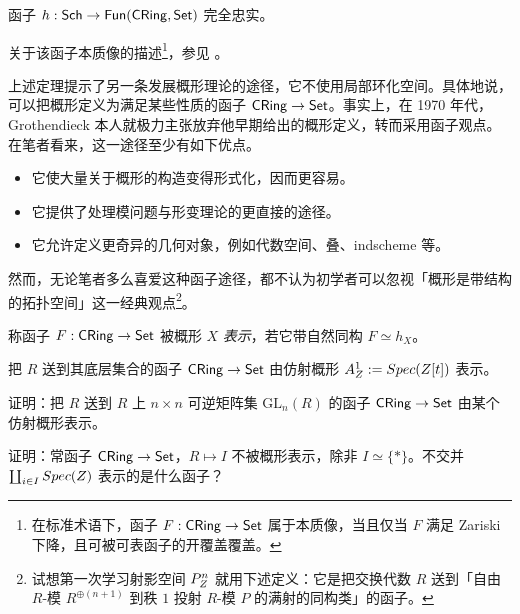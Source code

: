 \begin{theorem}\label{thm:8.2.3}
函子 $h:\mathsf{Sch}\to\mathsf{Fun}(\mathsf{CRing},\mathsf{Set})$ 完全忠实。
\end{theorem}

\begin{remark}\label{rem:8.2.4}
关于该函子本质像的描述\footnote{在标准术语下，函子 $F:\mathsf{CRing}\to\mathsf{Set}$ 属于本质像，当且仅当 $F$ 满足 Zariski 下降，且可被可表函子的开覆盖覆盖。}，参见 \cite[Chapter VI]{EH00}。
\end{remark}

\begin{remark}\label{rem:8.2.5}
上述定理提示了另一条发展概形理论的途径，它不使用局部环化空间。具体地说，可以把概形定义为满足某些性质的函子 $\mathsf{CRing}\to\mathsf{Set}$。事实上，在 1970 年代，Grothendieck 本人就极力主张放弃他早期给出的概形定义，转而采用函子观点。在笔者看来，这一途径至少有如下优点。
\begin{itemize}[leftmargin=1.6em,itemsep=0.2ex]
  \item 它使大量关于概形的构造变得形式化，因而更容易。
  \item 它提供了处理模问题与形变理论的更直接的途径。
  \item 它允许定义更奇异的几何对象，例如代数空间、叠、indscheme 等。
\end{itemize}
然而，无论笔者多么喜爱这种函子途径，都不认为初学者可以忽视「概形是带结构的拓扑空间」这一经典观点\footnote{试想第一次学习射影空间 $P^n_Z$ 就用下述定义：它是把交换代数 $R$ 送到「自由 $R$-模 $R^{\oplus(n+1)}$ 到秩 $1$ 投射 $R$-模 $P$ 的满射的同构类」的函子。}。
\end{remark}

\begin{definition}\label{def:8.2.6}
称函子 $F:\mathsf{CRing}\to\mathsf{Set}$ 被概形 $X$ \emph{表示}，若它带自然同构 $F\simeq h_X$。
\end{definition}

\begin{example}\label{ex:8.2.7}
把 $R$ 送到其底层集合的函子 $\mathsf{CRing}\to\mathsf{Set}$ 由仿射概形 $A^1_Z:=Spec(Z[t])$ 表示。
\end{example}

\begin{exercise}\label{exc:8.2.8}
证明：把 $R$ 送到 $R$ 上 $n\times n$ 可逆矩阵集 $\mathrm{GL}_n(R)$ 的函子 $\mathsf{CRing}\to\mathsf{Set}$ 由某个仿射概形表示。
\end{exercise}

\begin{exercise}\label{exc:8.2.9}
证明：常函子 $\mathsf{CRing}\to\mathsf{Set}$，$R\mapsto I$ 不被概形表示，除非 $I\simeq\{*\}$。不交并 $\coprod_{i\in I}Spec(Z)$ 表示的是什么函子？
\end{exercise}

